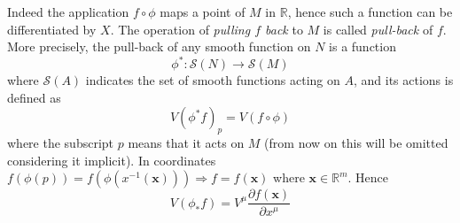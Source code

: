 \documentclass{article}
\begin{document}
Indeed the application $f \circ \phi$ maps a point of $M$ in $\mathbb{R}$, hence such a function can be differentiated by $X$. The operation of \emph{pulling $f$ back} to $M$ is called \emph{pull-back} of $f$. 
More precisely, the pull-back of any smooth function on $N$ is a function
\begin{equation*}
    \phi^* : \mathcal{S}(N) \to \mathcal{S}(M)
\end{equation*}
where $\mathcal{S}(A)$ indicates the set of smooth functions acting on $A$, and its actions is defined as
\begin{equation*}
    V(\phi^* f)_p = V(f \circ \phi)
\end{equation*}
where the subscript $p$ means that it acts on $M$ (from now on this will be omitted considering it implicit).
In coordinates $f(\phi(p)) = f(\phi(x^{-1}(\mathbf{x}))) \Rightarrow f = f(\mathbf{x})$ where $\mathbf{x} \in \mathbb{R}^m$. Hence
\begin{equation*}
    V(\phi_*f) = V^\mu \frac{\partial f(\mathbf{x})}{\partial x^\mu}
\end{equation*}
\end{document}
